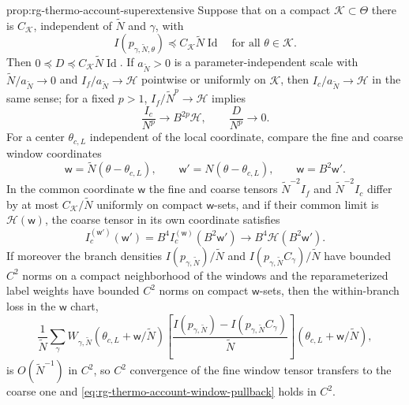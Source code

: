 {prop:rg-thermo-account-superextensive}
\label{prop:rg-thermo-account-window-coordinates}
Suppose that on a compact $\mathcal K\subset\Theta$ there is $C_{\mathcal K}$,
independent of $\widetilde N$ and $\gamma$, with
\begin{equation}
 I(p_{\gamma,\widetilde N,\theta})\preceq C_{\mathcal K}\widetilde N\operatorname{Id}
 \quad\text{for all }\theta\in\mathcal K.
 \label{eq:rg-thermo-account-extensive-branch-input}
\end{equation}
Then $0\preceq D\preceq C_{\mathcal K}\widetilde N\operatorname{Id}$. If
$a_{\widetilde N}>0$ is a parameter-independent scale with
$\widetilde N/a_{\widetilde N}\to0$ and $I_f/a_{\widetilde N}\to\mathcal H$
pointwise or uniformly on $\mathcal K$, then $I_c/a_{\widetilde N}\to\mathcal H$
in the same sense; for a fixed $p>1$, $I_f/\widetilde N^p\to\mathcal H$ implies
\begin{equation}
 \frac{I_c}{N^p}\longrightarrow B^{2p}\mathcal H,
 \qquad \frac{D}{N^p}\longrightarrow0.
 \label{eq:rg-thermo-account-power-limit}
\end{equation}
For a center $\theta_{c,L}$ independent of the local coordinate, compare the
fine and coarse window coordinates
\begin{equation}
 \mathsf w=\widetilde N(\theta-\theta_{c,L}),\qquad
 \mathsf w'=N(\theta-\theta_{c,L}),\qquad \mathsf w=B^2\mathsf w'.
 \label{eq:rg-thermo-account-window-chart}
\end{equation}
In the common coordinate $\mathsf w$ the fine and coarse tensors
$\widetilde N^{-2}I_f$ and $\widetilde N^{-2}I_c$ differ by at most
$C_{\mathcal K}/\widetilde N$ uniformly on compact $\mathsf w$-sets, and if
their common limit is $\mathcal H(\mathsf w)$, the coarse tensor in its own
coordinate satisfies
\begin{equation}
 I_c^{(\mathsf w')}(\mathsf w')=B^4 I_c^{(\mathsf w)}(B^2\mathsf w')
 \longrightarrow B^4\mathcal H(B^2\mathsf w').
 \label{eq:rg-thermo-account-window-pullback}
\end{equation}
If moreover the branch densities $I(p_{\gamma,\widetilde N})/\widetilde N$ and
$I(p_{\gamma,\widetilde N}C_\gamma)/\widetilde N$ have bounded $C^2$ norms on
a compact neighborhood of the windows and the reparameterized label weights
have bounded $C^2$ norms on compact $\mathsf w$-sets, then the within-branch
loss in the $\mathsf w$ chart,
\begin{equation}
 \frac1{\widetilde N}\sum_\gamma W_{\gamma,\widetilde N}(\theta_{c,L}+\mathsf w/\widetilde N)
 \left[\frac{I(p_{\gamma,\widetilde N})-I(p_{\gamma,\widetilde N}C_\gamma)}
            {\widetilde N}\right](\theta_{c,L}+\mathsf w/\widetilde N),
 \label{eq:rg-thermo-account-window-loss}
\end{equation}
is $O(\widetilde N^{-1})$ in $C^2$, so $C^2$ convergence of the fine window
tensor transfers to the coarse one and
\cref{eq:rg-thermo-account-window-pullback} holds in $C^2$.

